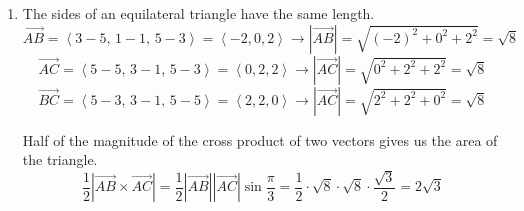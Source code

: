 \documentclass[a4paper, 12pt]{article}
\begin{document}
\begin{enumerate}[leftmargin=*,label=\textbf{\arabic*.}]
\begin{enumerate}[leftmargin=*,label=\textbf{\alph*.}]
\begin{enumerate}[leftmargin=*,label=\textbf{\roman*.}]
\item If $\mathbf u$ and $\mathbf v$ are parallel, the cross product of these vectors is equal to the zero vector.
\begin{align*}\mathbf{u}\times\mathbf{v}&=\left|\begin{array}{ccc}
\mathbf{i}&\mathbf{j}&\mathbf{k}\\
6&-3&2\\
4p+1&p-2&1
\end{array}\right|\\[1em]&=\mathbf{i}\left|\begin{array}{cc}
-3&2\\p-2&1
\end{array}\right|-\mathbf{j}\left|\begin{array}{cc}
6&2\\4p+1&1
\end{array}\right|+\mathbf{k}\left|\begin{array}{cc}
6&-3\\4p+1&p-2
\end{array}\right|\\[1em]&=[1\cdot(-3)-2(p-2)]\,\mathbf i-(6\cdot1-2(4p+1))\,\mathbf j +\\&\quad +[6(p-2)-(-3)(4p+1)]\,\mathbf k\\[1em]&=(1-2p)\,\mathbf i-(4-8p)\,\mathbf j+(-9+18p)\,\mathbf k=\mathbf0\implies \boxed{p=\frac12}\end{align*}

\end{enumerate}
\item The sides of an equilateral triangle have the same length.
\[\overrightarrow{AB}=\left\langle3-5,\,1-1,\,5-3\right\rangle=\left\langle-2,0,2\right\rangle\rightarrow\left|\overrightarrow{AB}\right|=\sqrt{(-2)^2+0^2+2^2}=\sqrt8\]
\[\overrightarrow{AC}=\left\langle5-5,\,3-1,\,5-3\right\rangle=\left\langle0,2,2\right\rangle\rightarrow\left|\overrightarrow{AC}\right|=\sqrt{0^2+2^2+2^2}=\sqrt8\]
\[\overrightarrow{BC}=\left\langle5-3,\,3-1,\,5-5\right\rangle=\left\langle2,2,0\right\rangle\rightarrow\left|\overrightarrow{AC}\right|=\sqrt{2^2+2^2+0^2}=\sqrt8\]

Half of the magnitude of the cross product of two vectors gives us the area of the triangle.
\[\frac12\left|\overrightarrow{AB}\times\overrightarrow{AC}\right|=\frac12\left|\overrightarrow{AB}\right|\left|\overrightarrow{AC}\right|\sin\frac\pi3=\frac12\cdot\sqrt8\cdot\sqrt8\cdot\frac{\sqrt3}2=\boxed{2\sqrt3}\]

\end{enumerate}


\end{enumerate}
\end{document}
